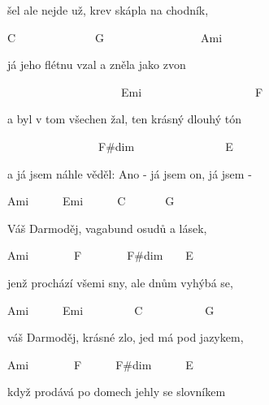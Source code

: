 šel ale nejde už, krev skápla na chodník,

C~~~~~~~~~~~~~~G~~~~~~~~~~~~~~~~~Ami~

já jeho flétnu vzal a zněla jako zvon

~~~~~~~~~~~~~~~~~~~~Emi~~~~~~~~~~~~~~~~~~~~F~~

a byl v tom všechen žal, ten krásný dlouhý tón

~~~~~~~~~~~~~~~~F\#dim~~~~~~~~~~~~~~~~E\7~~~~~~~~~

a já jsem náhle věděl: Ano - já jsem on, já jsem -

\bigskip

\begin{chorustext}
Ami~~~~~~Emi~~~~~~C~~~~~~~G~~~~~~~~~~

Váš Darmoděj, vagabund osudů a lásek,

Ami~~~~~~~~F~~~~~~~~F\#dim~~~~E\7~~~

jenž prochází všemi sny, ale dnům vyhýbá se,

Ami~~~~~~Emi~~~~~~~~~C~~~~~~~~~~~G~~~~~~~~~~

váš Darmoděj, krásné zlo, jed má pod jazykem,

Ami~~~~~~~~F~~~~~~F\#dim~~~~~~E\7~~~

když prodává po domech jehly se slovníkem
\end{chorustext}